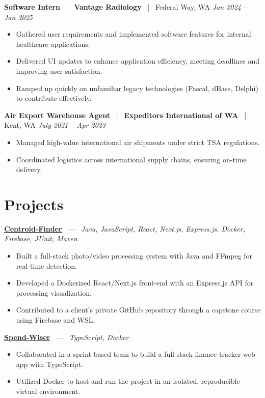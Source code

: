 \documentclass[10pt, letterpaper]{article}
\newcommand{\jobhead}[4]{%
  \vspace{5pt}%
  {\bfseries\color{dark}#1}%
  ~{\color{light}|}~%
  {\bfseries\color{navy}#2}%
  ~{\color{light}|}~%
  {\color{light}#3}%
  \hfill{\color{light}\small\textit{#4}}\\[-2pt]%
}
\newcommand{\projhead}[3]{%
  \vspace{5pt}%
  {\bfseries\color{dark}\href{#2}{#1}}%
  ~{\color{light}---}~%
  {\color{light}\small\textit{#3}}\\[-2pt]%
}
\begin{document}
\jobhead{Software Intern}{Vantage Radiology}{Federal Way, WA}{Jan 2024 – Jan 2025}
\begin{itemize}
  \item Gathered user requirements and implemented software features for internal healthcare applications.
  \item Delivered UI updates to enhance application efficiency, meeting deadlines and improving user satisfaction.
  \item Ramped up quickly on unfamiliar legacy technologies (Pascal, dBase, Delphi) to contribute effectively.
\end{itemize}

\jobhead{Air Export Warehouse Agent}{Expeditors International of WA}{Kent, WA}{July 2021 – Apr 2023}
\begin{itemize}
  \item Managed high-value international air shipments under strict TSA regulations.
  \item Coordinated logistics across international supply chains, ensuring on-time delivery.
\end{itemize}

\section{Projects}

\projhead{Centroid-Finder}{https://github.com/xavierb117/centroid-finder}{Java, JavaScript, React, Next.js, Express.js, Docker, Firebase, JUnit, Maven}
\begin{itemize}
  \item Built a full-stack photo/video processing system with Java and FFmpeg for real-time detection.
  \item Developed a Dockerized React/Next.js front-end with an Express.js API for processing visualization.
  \item Contributed to a client's private GitHub repository through a capstone course using Firebase and WSL.
\end{itemize}

\projhead{Spend-Wiser}{https://github.com/JesseChum/w26-sdev372-spendwiser-finance-tracker}{TypeScript, Docker}
\begin{itemize}
  \item Collaborated in a sprint-based team to build a full-stack finance tracker web app with TypeScript.
  \item Utilized Docker to host and run the project in an isolated, reproducible virtual environment.
\end{itemize}
\end{document}
